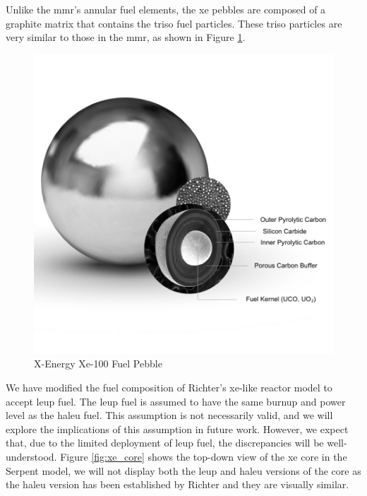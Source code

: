 Unlike the \gls{mmr}'s annular fuel elements, the \gls{xe} pebbles are composed of a graphite matrix that contains the \gls{triso} fuel particles. These \gls{triso} particles are very similar to those in the \gls{mmr}, as shown in Figure \ref{fig:xe_fuel}.

\begin{figure}[H]
    \centering
    \includegraphics[scale=0.28]{images/reactor_design/graphic-triso-x-pebble.jpg}
    \caption{X-Energy Xe-100 Fuel Pebble \cite{xe_fuel}}
    \label{fig:xe_fuel}
\end{figure}


We have modified the fuel composition of Richter's \gls{xe}-like reactor model to accept \gls{leup} fuel. The \gls{leup} fuel is assumed to have the same burnup and power level as the \gls{haleu} fuel. This assumption is not necessarily valid, and we will explore the implications of this assumption in future work. However, we expect that, due to the limited deployment of \gls{leup} fuel, the discrepancies will be well-understood. Figure \ref{fig:xe_core} shows the top-down view of the \gls{xe} core in the Serpent model, we will not display both the \gls{leup} and \gls{haleu} versions of the core as the \gls{haleu} version has been established by Richter \cite{richter_thesis_2022} and they are visually similar.

